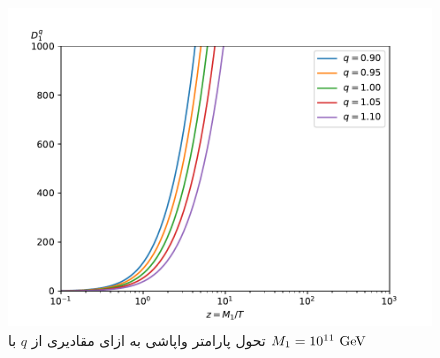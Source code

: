 \documentclass[a4paper]{book}
\begin{document}
\begin{figure}[!h]
	\centering
	\includegraphics[width=13cm]{fig-D1-nonextensive.pdf}
	\caption{تحول پارامتر واپاشی به ازای مقادیری از {\footnotesize$q$} با {\footnotesize$M_1 = 10^{11}\ \rm GeV$} \label{fig:D1-nonextensive}}
\end{figure}
\end{document}
